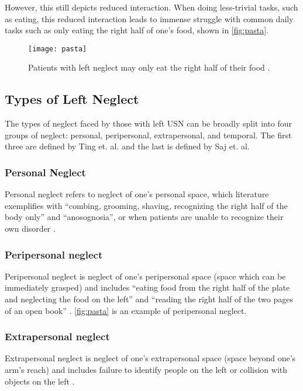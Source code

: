 However, this still depicts reduced interaction. When doing less-trivial tasks,
such as eating, this reduced interaction leads to immense struggle with common
daily tasks such as only eating the right half of one’s food, shown in
\autoref{fig:pasta}.

\begin{figure}[h]
  \centering
  \texttt{[image: pasta]}
  \caption{Patients with left neglect may only eat the right half of their food
    \cite{sutton_left_nodate}.} 
  \label{fig:pasta}
\end{figure}

\subsection{Types of Left Neglect}

The types of neglect faced by those with left USN can be broadly split into
four groups of neglect: personal, peripersonal, extrapersonal, and
temporal. The first three are defined by Ting et. al. and the last is defined
by Saj et. al. 

\subsubsection{Personal Neglect}

Personal neglect refers to neglect of one’s personal space, which literature
exemplifies with ``combing, grooming, shaving, recognizing the right half of the
body only'' and ``anosognosia'', or when patients are unable to recognize their
own disorder \cite{ting_visual_2011}.

\subsubsection{Peripersonal neglect}

Peripersonal neglect is neglect of one’s peripersonal space (space which can be
immediately grasped) and includes ``eating food from the right half of the plate
and neglecting the food on the left'' and ``reading the right half of the two
pages of an open book'' \cite{ting_visual_2011}. \autoref{fig:pasta} is an
example of peripersonal neglect.

\subsubsection{Extrapersonal neglect}

Extrapersonal neglect is neglect of one’s extrapersonal space (space beyond
one’s arm’s reach) and includes failure to identify people on the left or
collision with objects on the left \cite{ting_visual_2011}.

